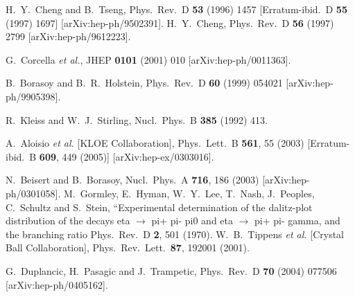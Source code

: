 \documentclass{article}
\begin{document}
\begin{thebibliography}{99}
  H.~Y.~Cheng and B.~Tseng,
  Phys.\ Rev.\  D {\bf 53} (1996) 1457
  [Erratum-ibid.\  D {\bf 55} (1997) 1697]
  [arXiv:hep-ph/9502391].
  H.~Y.~Cheng,
  Phys.\ Rev.\  D {\bf 56} (1997) 2799
  [arXiv:hep-ph/9612223].

  G.~Corcella {\it et al.},
  JHEP {\bf 0101} (2001) 010
  [arXiv:hep-ph/0011363].

B.~Borasoy and B.~R.~Holstein,
Phys.\ Rev.\  D {\bf 60} (1999) 054021 [arXiv:hep-ph/9905398].

 R.~Kleiss and W.~J.~Stirling,
Nucl.\ Phys.\  B {\bf 385} (1992) 413.

  A.~Aloisio {\it et al.}  [KLOE Collaboration],
  Phys.\ Lett.\  B {\bf 561}, 55 (2003)
  [Erratum-ibid.\  B {\bf 609}, 449 (2005)]
  [arXiv:hep-ex/0303016].

  N.~Beisert and B.~Borasoy,
  Nucl.\ Phys.\  A {\bf 716}, 186 (2003)
  [arXiv:hep-ph/0301058].
  M.~Gormley, E.~Hyman, W.~Y.~Lee, T.~Nash, J.~Peoples, C.~Schultz and S.~Stein,
   ``Experimental determination of the dalitz-plot distribution of the decays
   eta $\to$ pi+ pi- pi0 and eta $\to$ pi+ pi- gamma, and the branching ratio
  Phys.\ Rev.\  D {\bf 2}, 501 (1970).
  W.~B.~Tippens {\it et al.}  [Crystal Ball Collaboration],
  Phys.\ Rev.\ Lett.\  {\bf 87}, 192001 (2001).

G.~Duplancic, H.~Pasagic and J.~Trampetic,
Phys.\ Rev.\  D {\bf 70} (2004) 077506 [arXiv:hep-ph/0405162].


\end{thebibliography}
\end{document}
